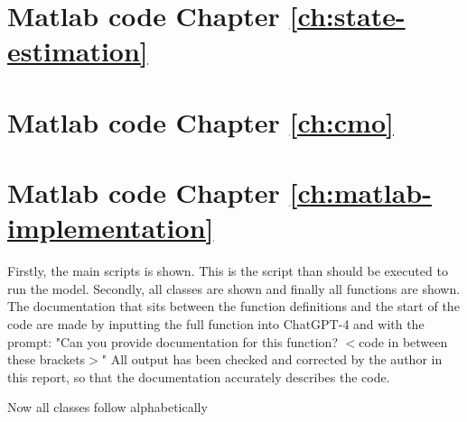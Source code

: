 \begin{appendices}
\newpage
\section{Matlab code Chapter \ref{ch:state-estimation}}


\newpage
\section{Matlab code Chapter \ref{ch:cmo}}


\newpage
\section{Matlab code Chapter \ref{ch:matlab-implementation}}\label{ap:matlab-code}
Firstly, the main scripts is shown. This is the script than should be executed to run the model. Secondly, all classes are shown and finally all functions are shown. The documentation that sits between the function definitions and the start of the code are made by inputting the full function into ChatGPT-4 and with the prompt: "Can you provide documentation for this function? $<$code in between these brackets$>$" All output has been checked and corrected by the author in this report, so that the documentation accurately describes the code.

Now all classes follow alphabetically








\end{appendices}
